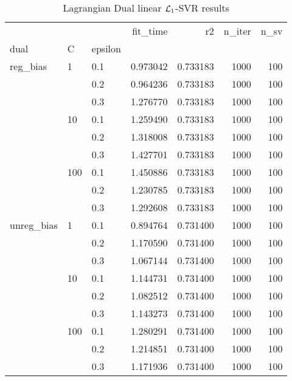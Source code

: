 \begin{table}[H]
\centering
\caption{Lagrangian Dual linear $\protect \mathcal{L}_1$-SVR results}
\label{linear_lagrangian_dual_l1_svr_cv_results}
\begin{tabular}{lllrrrr}
\toprule
           &     &     &  fit\_time &        r2 &  n\_iter &  n\_sv \\
dual & C & epsilon &           &           &         &       \\
\midrule
reg\_bias & 1   & 0.1 &  0.973042 &  0.733183 &    1000 &   100 \\
           &     & 0.2 &  0.964236 &  0.733183 &    1000 &   100 \\
           &     & 0.3 &  1.276770 &  0.733183 &    1000 &   100 \\
           & 10  & 0.1 &  1.259490 &  0.733183 &    1000 &   100 \\
           &     & 0.2 &  1.318008 &  0.733183 &    1000 &   100 \\
           &     & 0.3 &  1.427701 &  0.733183 &    1000 &   100 \\
           & 100 & 0.1 &  1.450886 &  0.733183 &    1000 &   100 \\
           &     & 0.2 &  1.230785 &  0.733183 &    1000 &   100 \\
           &     & 0.3 &  1.292608 &  0.733183 &    1000 &   100 \\
unreg\_bias & 1   & 0.1 &  0.894764 &  0.731400 &    1000 &   100 \\
           &     & 0.2 &  1.170590 &  0.731400 &    1000 &   100 \\
           &     & 0.3 &  1.067144 &  0.731400 &    1000 &   100 \\
           & 10  & 0.1 &  1.144731 &  0.731400 &    1000 &   100 \\
           &     & 0.2 &  1.082512 &  0.731400 &    1000 &   100 \\
           &     & 0.3 &  1.143273 &  0.731400 &    1000 &   100 \\
           & 100 & 0.1 &  1.280291 &  0.731400 &    1000 &   100 \\
           &     & 0.2 &  1.214851 &  0.731400 &    1000 &   100 \\
           &     & 0.3 &  1.171936 &  0.731400 &    1000 &   100 \\
\bottomrule
\end{tabular}
\end{table}
